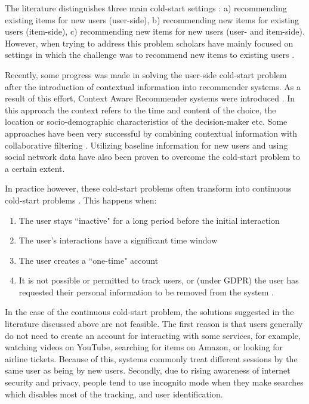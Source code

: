 \documentclass[a4paper,12pt]{article}
\begin{document}
The literature distinguishes three main cold-start settings \citep{park2009pairwise}: a) recommending existing items for new users (user-side), b) recommending new items for existing users (item-side), c) recommending new items for new users (user- and item-side). However, when trying to address this problem scholars have mainly focused on settings in which the challenge was to recommend new items to existing users \citep{zhang2010solving}.

Recently, some progress was made in solving the user-side cold-start problem after the introduction of contextual information into recommender systems. As a result of this effort, Context Aware Recommender systems were introduced \citep{adomavicius2011context}. In this approach the context refers to the time and content of the choice, the location or socio-demographic characteristics of the decision-maker etc.  Some approaches have been very successful by combining contextual information with collaborative filtering \citep{aharon2013off,bykau2013coping,saveski2014item}. Utilizing baseline information for new users \citep{kluver2014evaluating} and using social network data \citep{guy2009personalized} have also been proven to overcome the cold-start problem to a certain extent.

In practice however, these cold-start problems often transform into continuous cold-start problems \citep{kiseleva2016beyond}. This happens when:
\begin{enumerate}
    \item The user stays ``inactive" for a long period before the initial interaction
    \item The user's interactions have a significant time window
    \item The user creates a ``one-time" account
    \item It is not possible or permitted to track users, or (under GDPR) the user has requested their personal information to be removed from the system \citep{hildebrandt2022issue}.
\end{enumerate}

In the case of the continuous cold-start problem, the solutions suggested in the literature discussed above are not feasible. The first reason is that users generally do not need to create an account for interacting with some services, for example,  watching videos on YouTube, searching for items on Amazon, or looking for airline tickets. Because of this, systems commonly treat different sessions by the same user as being by new users. Secondly, due to rising awareness of internet security and privacy, people tend to use incognito mode when they make searches \citep{anton2010internet} which disables most of the tracking, and user identification.
\end{document}

